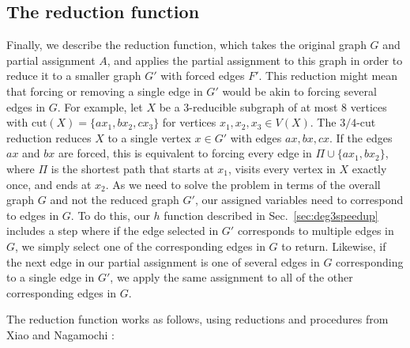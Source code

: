 \subsection{The reduction function}
\label{sec:reduction}

Finally, we describe the reduction function, which takes the original graph $G$ and partial assignment $A$, and applies the partial assignment to this graph in order to reduce it to a smaller graph $G'$ with forced edges $F'$. This reduction might mean that forcing or removing a single edge in $G'$ would be akin to forcing several edges in $G$. For example, let $X$ be a $3$-reducible subgraph of at most $8$ vertices with $\text{cut}(X) = \{ax_1, bx_2, cx_3\}$ for vertices $x_1, x_2, x_3 \in V(X)$. The $3/4$-cut reduction reduces $X$ to a single vertex $x \in G'$ with edges $ax, bx, cx$. If the edges $ax$ and $bx$ are forced, this is equivalent to forcing every edge in $\Pi \cup \{ax_1, bx_2\}$, where $\Pi$ is the shortest path that starts at $x_1$, visits every vertex in $X$ exactly once, and ends at $x_2$. As we need to solve the problem in terms of the overall graph $G$ and not the reduced graph $G'$, our assigned variables need to correspond to edges in $G$. To do this, our $h$ function described in Sec.\ \ref{sec:deg3speedup} includes a step where if the edge selected in $G'$ corresponds to multiple edges in $G$, we simply select one of the corresponding edges in $G$ to return. Likewise, if the next edge in our partial assignment is one of several edges in $G$ corresponding to a single edge in $G'$, we apply the same assignment to all of the other corresponding edges in $G$.

The reduction function works as follows, using reductions and procedures from Xiao and Nagamochi \cite{xiao2016degree3}:

